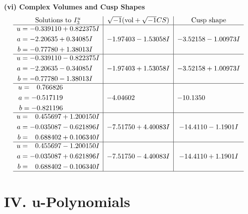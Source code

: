 \documentclass[1p]{elsarticle_modified}
\theoremstyle{definition}
\newcommand{\I}{\sqrt{-1}}
\begin{document}
\newpage\flushleft \textbf{(vi) Complex Volumes and Cusp Shapes}
$$\begin{array}{c|c|c}  
\text{Solutions to }I^u_{3}& \I (\text{vol} + \sqrt{-1}CS) & \text{Cusp shape}\\
 \hline 
\begin{aligned}
u &= -0.339110 + 0.822375 I \\
a &= -2.20635 + 0.34085 I \\
b &= -0.77780 + 1.38013 I\end{aligned}
 & -1.97403 - 1.53058 I & -3.52158 - 1.00973 I \\ \hline\begin{aligned}
u &= -0.339110 - 0.822375 I \\
a &= -2.20635 - 0.34085 I \\
b &= -0.77780 - 1.38013 I\end{aligned}
 & -1.97403 + 1.53058 I & -3.52158 + 1.00973 I \\ \hline\begin{aligned}
u &= \phantom{-}0.766826\phantom{ +0.000000I} \\
a &= -0.517119\phantom{ +0.000000I} \\
b &= -0.821196\phantom{ +0.000000I}\end{aligned}
 & -4.04602\phantom{ +0.000000I} & -10.1350\phantom{ +0.000000I} \\ \hline\begin{aligned}
u &= \phantom{-}0.455697 + 1.200150 I \\
a &= -0.035087 - 0.621896 I \\
b &= \phantom{-}0.688402 + 0.106340 I\end{aligned}
 & -7.51750 + 4.40083 I & -14.4110 - 1.1901 I \\ \hline\begin{aligned}
u &= \phantom{-}0.455697 - 1.200150 I \\
a &= -0.035087 + 0.621896 I \\
b &= \phantom{-}0.688402 - 0.106340 I\end{aligned}
 & -7.51750 - 4.40083 I & -14.4110 + 1.1901 I\\
 \hline 
 \end{array}$$\newpage
\newpage\renewcommand{\arraystretch}{1}
\centering \section*{ IV. u-Polynomials}
\end{document}
